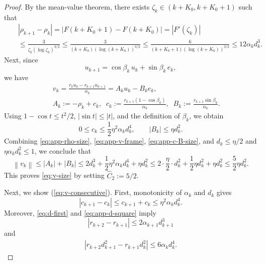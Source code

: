 \documentclass[11pt]{article}
\numberwithin{equation}{section}
\newcommand{\norm}[1]{\left\lVert #1\right\rVert}
\newcommand{\nn}{\nonumber}
\begin{document}
\begin{proof}
By the mean-value theorem, there exists
$\zeta_k\in(k+K_0,k+K_0+1)$ such that
\begin{eqnarray*}
 &&|\rho_{k+1}-\rho_k|
 =|F(k+K_0+1)-F(k+K_0)|
 =|F'(\zeta_k)|\nn\\
 &&
 \leq
 \frac{3}{\zeta_k(\log \zeta_k)^{3/2}}\leq\frac{3}{(k+K_0)(\log (k+K_0))^{3/2}}\leq\frac{6}{(k+K_0+1)(\log (k+K_0))^{3/2}}
 \leq 12\alpha_k d_k^3.
\end{eqnarray*}
\noindent Next, since
\[
    u_{k+1}=\cos\beta_k\,u_k+\sin\beta_k\,e_k,
\]
we have
\begin{eqnarray}
    &&v_k=\frac{r_ku_k-r_{k+1}u_{k+1}}{\alpha_k}=A_ku_k-B_ke_k,\nn\\
    &&A_k:=-\rho_k+c_k,
    \;\;
    c_k:=\frac{r_{k+1}(1-\cos\beta_k)}{\alpha_k},
    \;\;
    B_k:=\frac{r_{k+1}\sin\beta_k}{\alpha_k}.
    \label{eq:app-v-frame}
\end{eqnarray}
%
Using \(1-\cos t\leq t^2/2\), \(|\sin t|\leq|t|\), and the definition of
\(\beta_k\), we obtain
\begin{equation}
    0\leq c_k\leq \frac{1}{2}\eta^2\alpha_kd_k^4,
    \qquad
    |B_k|\leq\eta d_k^2.
    \label{eq:app-c-B-size}
\end{equation}
Combining \eqref{eq:app-rho-size}, \eqref{eq:app-v-frame},
\eqref{eq:app-c-B-size}, and \(d_k\leq\eta/2\) and $\eta\alpha_k d_k^2\le 1$, we conclude that
\[
    \norm{v_k}
    \leq |A_k|+|B_k|
    \leq 2 d_k^3+\frac{1}{2}\eta^2 \alpha_k d_k^4 +\eta d_k^2
    \leq 2 \cdot\frac{\eta}{2}\cdot d_k^2+\frac{1}{2}\eta d_k^2+\eta d_k^2\le\frac{5}{2}\eta d_k^2.
\]
This proves \eqref{eq:v-size} by setting $\widehat C_2:=5/2$.

Next, we show (\ref{eq:v-consecutive}).
First, monotonicity of \(\alpha_k\) and \(d_k\) gives
\begin{equation}
    |c_{k+1}-c_k|
    \leq c_{k+1}+c_k
    \leq \eta^2\alpha_kd_k^4.
    \label{eq:app-c-difference}
\end{equation}
 Moreover,
\eqref{eq:d-first} and \eqref{eq:app-d-square} imply
\[
    |r_{k+2}-r_{k+1}|\leq 2 \alpha_{k+1}d_{k+1}^3
\]
and
\begin{eqnarray}\label{addkey}
    \left|
       r_{k+2}d_{k+1}^2-r_{k+1}d_k^2
    \right|
    \leq 6\alpha_kd_k^4.
\end{eqnarray}



\end{proof}
\end{document}
